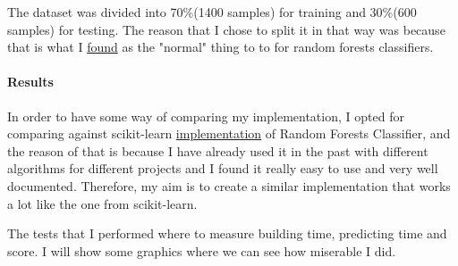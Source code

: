 \documentclass[11pt]{article}
\begin{document}
The dataset was divided into 70\%(1400 samples) for training and
30\%(600 samples) for testing. The reason that I chose to split it in
that way was because that is what I
\href{https://www.kaggle.com/general/9456}{found} as the "normal" thing
to to for random forests classifiers.

    \paragraph{Results}\label{results}

    In order to have some way of comparing my implementation, I opted for
comparing against scikit-learn
\href{http://scikit-learn.org/stable/modules/generated/sklearn.ensemble.RandomForestClassifier.html\#sklearn.ensemble.RandomForestClassifier}{implementation}
of Random Forests Classifier, and the reason of that is because I have
already used it in the past with different algorithms for different
projects and I found it really easy to use and very well documented.
Therefore, my aim is to create a similar implementation that works a lot
like the one from scikit-learn.

The tests that I performed where to measure building time, predicting
time and score. I will show some graphics where we can see how miserable
I did.
\end{document}
